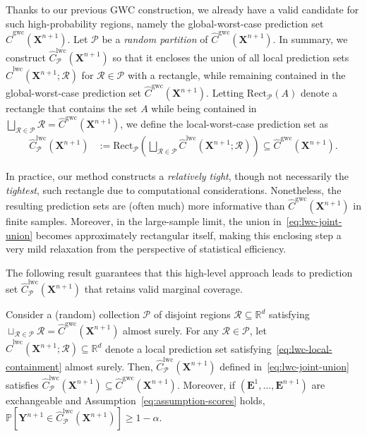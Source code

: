 {Thanks to our previous GWC construction, we already have a valid candidate for such high-probability regions, namely the global-worst-case prediction set $\hat{C}^{\mathrm{gwc}}(\mathbf{X}^{n+1})$. Let $\mathcal{P}$ be a {\em random partition} of $\hat{C}^{\mathrm{gwc}}(\mathbf{X}^{n+1})$. In summary, we construct $\hat{C}^{\mathrm{lwc}}_{\mathcal{P}}(\mathbf{X}^{n+1})$ so that it encloses the union of all local prediction sets $\hat{C}^\mathrm{lwc}(\mathbf{X}^{n+1}; \mathcal{R})$ for $\mathcal{R} \in \mathcal{P}$ with a rectangle, while remaining contained in the global-worst-case prediction set $\hat{C}^{\mathrm{gwc}}(\mathbf{X}^{n+1})$. Letting $\mathrm{Rect}_{\mathcal{P}}(A)$ denote a rectangle that contains the set $A$ while being contained in $\bigsqcup_{\mathcal{R} \in \mathcal{P}}\mathcal{R} = \hat{C}^{\mathrm{gwc}}(\mathbf{X}^{n+1})$, we define the local-worst-case prediction set as
\begin{equation}
    \begin{aligned}
        \hat{C}^{\mathrm{lwc}}_\mathcal{P}(\mathbf{X}^{n+1}) &:= \mathrm{Rect}_{\mathcal{P}}\left(\bigsqcup_{\mathcal{R} \in \mathcal{P}} \hat{C}^\mathrm{lwc}(\mathbf{X}^{n+1}; \mathcal{R})\right) \subseteq \hat{C}^{\mathrm{gwc}}(\mathbf{X}^{n+1}).
    \label{eq:lwc-joint-union}
    \end{aligned}
\end{equation}
}

In practice, our method constructs a {\em relatively tight}, though not necessarily the {\em tightest}, such rectangle due to computational considerations. Nonetheless, the resulting prediction sets are (often much) more informative than  $\hat{C}^{\mathrm{gwc}}(\mathbf{X}^{n+1})$ in finite samples. Moreover, in the large-sample limit, the union in~\eqref{eq:lwc-joint-union} becomes approximately rectangular itself, making this enclosing step a very mild relaxation from the perspective of statistical efficiency.

The following result guarantees that this high-level approach leads to prediction set $\hat{C}^{\mathrm{lwc}}_\mathcal{P}(\mathbf{X}^{n+1})$ that retains valid marginal coverage.
\begin{proposition}
Consider a (random) collection $\mathcal{P}$ of disjoint regions $\mathcal{R} \subseteq \mathbb{R}^d$ satisfying $\sqcup_{\mathcal{R} \in \mathcal{P} } \mathcal{R} = \hat{C}^{\mathrm{gwc}}(\mathbf{X}^{n+1})$ almost surely.
For any $\mathcal{R} \in \mathcal{P}$, let $\hat{C}^\mathrm{lwc}(\mathbf{X}^{n+1}; \mathcal{R}) \subseteq \mathbb{R}^d$ denote a local prediction set satisfying~\eqref{eq:lwc-local-containment} almost surely.
Then, $\hat{C}^{\mathrm{lwc}}_\mathcal{P}(\mathbf{X}^{n+1})$ defined in~\eqref{eq:lwc-joint-union}  satisfies $\hat{C}^{\mathrm{lwc}}_\mathcal{P}(\mathbf{X}^{n+1}) \subseteq \hat{C}^{\mathrm{gwc}}(\mathbf{X}^{n+1})$.
Moreover, if $(\mathbf{E}^1,\ldots,\mathbf{E}^{n+1})$ are exchangeable and Assumption~\ref{eq:assumption-scores} holds, $\mathbb{P}[ \mathbf{Y}^{n+1} \in \hat{C}^{\mathrm{lwc}}_\mathcal{P}(\mathbf{X}^{n+1}) ] \ge 1 - \alpha$.
\label{prop:lwc-approximation}
\end{proposition}

